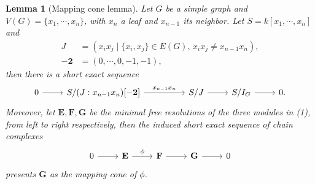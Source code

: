 \documentclass[dvipsnames,10pt]{article}
\newtheorem{lemma}[theorem]{Lemma}
\begin{document}
\begin{lemma}[Mapping cone lemma]
    Let $G$ be a simple graph and $V(G) = \{x_1,\cdots,x_n\}$, with $x_n$ a leaf and $x_{n-1}$ its neighbor. Let $S=k[x_1,\cdots,x_n]$ and
    \begin{align*}
        J&=(x_ix_j\mid \{x_i,x_j\}\in E(G),\,x_ix_j\neq x_{n-1}x_n),\\
        -\mathbf{2} &= (0,\cdots,0,-1,-1),
    \end{align*}
    then there is a short exact sequence
    \begin{equation}
        \begin{tikzcd}
            0 \arrow[r] & S/(J:x_{n-1}x_n)[-\mathbf{2}] \arrow[rr, "{x_{n-1}x_n}"] & & S/J \arrow[r] & S/I_G \arrow[r] & 0.
        \end{tikzcd}
    \end{equation}
    Moreover, let $\mathbf{E}, \mathbf{F}, \mathbf{G}$ be the minimal free resolutions of the three modules in (1), from left to right respectively, then the induced short exact sequence of chain complexes
    \begin{equation*}
        \begin{tikzcd}
            0 \arrow[r] & \mathbf{E} \arrow[r, "\phi"] & \mathbf{F} \arrow[r] & \mathbf{G} \arrow[r] & 0
        \end{tikzcd}
    \end{equation*}
    presents $\mathbf{G}$ as the mapping cone of $\phi$.
\end{lemma}
\end{document}

